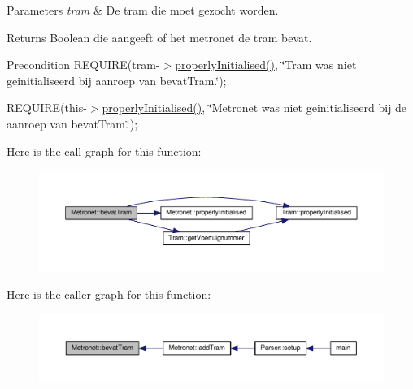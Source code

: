 \begin{DoxyParams}{Parameters}
{\em tram} & De tram die moet gezocht worden. \\
\hline
\end{DoxyParams}
\begin{DoxyReturn}{Returns}
Boolean die aangeeft of het metronet de tram bevat. 
\end{DoxyReturn}
\begin{DoxyPrecond}{Precondition}
R\+E\+Q\+U\+I\+RE(tram-\/$>$\hyperlink{class_metronet_a3d2adce29a947f162924279b766de645}{properly\+Initialised()}, \char`\"{}\+Tram was niet geinitialiseerd bij aanroep van bevat\+Tram.\char`\"{}); 

R\+E\+Q\+U\+I\+RE(this-\/$>$\hyperlink{class_metronet_a3d2adce29a947f162924279b766de645}{properly\+Initialised()}, \char`\"{}\+Metronet was niet geinitialiseerd bij de aanroep van bevat\+Tram.\char`\"{}); 
\end{DoxyPrecond}


Here is the call graph for this function\+:
\nopagebreak
\begin{figure}[H]
\begin{center}
\leavevmode
\includegraphics[width=350pt]{class_metronet_a0bcafdae671ac5fff7a4b54429f440ba_cgraph}
\end{center}
\end{figure}




Here is the caller graph for this function\+:
\nopagebreak
\begin{figure}[H]
\begin{center}
\leavevmode
\includegraphics[width=350pt]{class_metronet_a0bcafdae671ac5fff7a4b54429f440ba_icgraph}
\end{center}
\end{figure}


